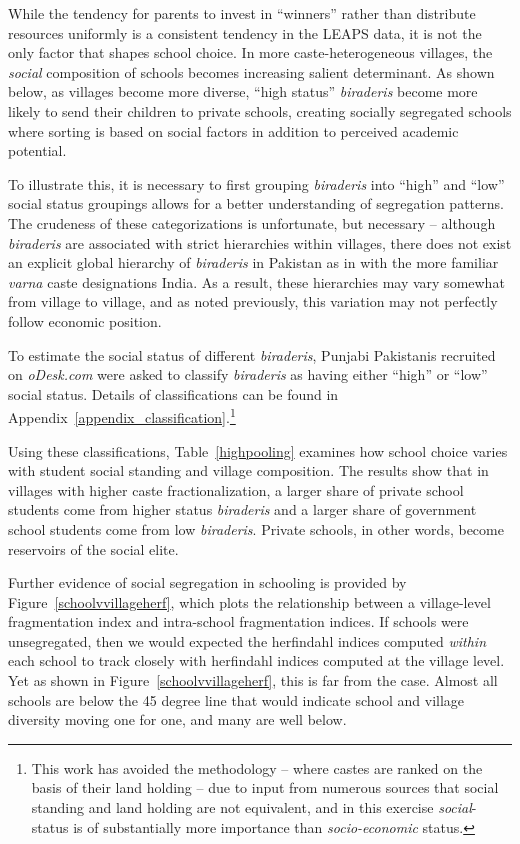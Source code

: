 \documentclass[Eubank_pk_ethnic_sorting.tex]{subfiles}
\begin{document}
While the tendency for parents to invest in ``winners'' rather than distribute resources uniformly is a consistent tendency in the LEAPS data, it is not the only factor that shapes school choice.  In more caste-heterogeneous villages, the \emph{social} composition of schools becomes increasing salient determinant. As shown below, as villages become more diverse, ``high status'' \emph{biraderis} become more likely to send their children to private schools, creating socially segregated schools where sorting is based on social factors in addition to perceived academic potential. 


To illustrate this, it is necessary to first grouping \emph{biraderis} into ``high'' and ``low'' social status groupings allows for a better understanding of segregation patterns. The crudeness of these categorizations is unfortunate, but necessary -- although \emph{biraderis} are associated with strict hierarchies within villages, there does not exist an explicit global hierarchy of \emph{biraderis} in Pakistan as in with the more familiar \emph{varna} caste designations India. As a result, these hierarchies may vary somewhat from village to village, and as noted previously, this variation may not perfectly follow economic position.

To estimate the social status of different \emph{biraderis}, Punjabi Pakistanis recruited on \emph{oDesk.com} were asked to classify \emph{biraderis} as having either ``high'' or ``low'' social status. Details of classifications can be found in Appendix~\ref{appendix_classification}.\footnote{This work has avoided the \cite{Jacoby:2011tc} methodology -- where castes are ranked on the basis of their land holding -- due to input from numerous sources that social standing and land holding are not equivalent, and in this exercise \emph{social}-status is of substantially more importance than \emph{socio-economic} status.}

Using these classifications, Table~\ref{highpooling} examines how school choice varies with student social standing and village composition. The results show that in villages with higher caste fractionalization, a larger share of private school students come from higher status \emph{biraderis} and a larger share of government school students come from low \emph{biraderis}. Private schools, in other words, become reservoirs of the social elite.




Further evidence of social segregation in schooling is provided by Figure~\ref{schoolvvillageherf}, which plots the relationship between a village-level fragmentation index and intra-school fragmentation indices. If schools were unsegregated, then we would expected the herfindahl indices computed \emph{within} each school to track closely with herfindahl indices computed at the village level. Yet as shown in Figure~\ref{schoolvvillageherf}, this is far from the case. Almost all schools are below the 45 degree line that would indicate school and village diversity moving one for one, and many are well below.
\end{document}
